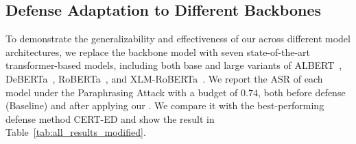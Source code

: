\subsection{Defense Adaptation to Different Backbones}
\label{sec:replacement}
To demonstrate the generalizability and effectiveness of our \modelname across different model architectures, we replace the backbone model with seven state-of-the-art transformer-based models, including both base and large variants of ALBERT~\cite{lan2019albert}, DeBERTa~\cite{he2020deberta}, RoBERTa~\cite{liu2019roberta}, and XLM-RoBERTa~\cite{conneau2019unsupervised}.
We report the ASR of each model under the Paraphrasing Attack with a budget of $0.74$, both before defense (Baseline) and after applying our . We compare it with the best-performing defense method CERT-ED and show the result in Table~\ref{tab:all_results_modified}.

\begin{table}[ht]
\centering
\renewcommand\arraystretch{1.4}
\footnotesize
{}
\caption{Experiment results of various models before and after applying  under Paraphrasing attack. The best result in each group is highlighted with a \colorbox{green!50}{green} background.}
\label{tab:performance_comparison}
\end{table}

